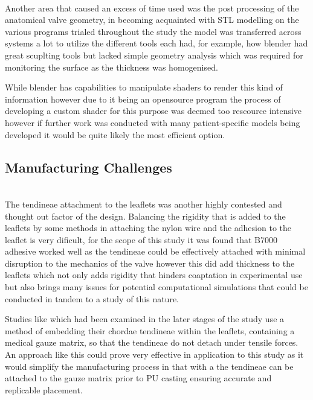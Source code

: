 \\
Another area that caused an excess of time used was the post processing of the anatomical valve geometry, in becoming acquainted with STL modelling on the various programs trialed throughout the study the model was transferred across systems a lot to utilize the different tools each had, for example, how blender had great scuplting tools but lacked simple geometry analysis which was required for monitoring the surface as the thickness was homogenised.

While blender has capabilities to manipulate shaders to render this kind of information however due to it being an opensource program the process of developing a custom shader for this purpose was deemed too rescource intensive however if further work was conducted with many patient-specific models being developed it would be quite likely the most efficient option.

\subsection{Manufacturing Challenges}

\\
The tendineae attachment to the leaflets was another highly contested and thought out factor of the design. Balancing the rigidity that is added to the leaflets by some methods in attaching the nylon wire and the adhesion to the leaflet is very dificult, for the scope of this study it was found that B7000 adhesive worked well as the tendineae could be effectively attached with minimal disruption to the mechanics of the valve however this did add thickness to the leaflets which not only adds rigidity that hinders coaptation in experimental use but also brings many issues for potential computational simulations that could be conducted in tandem to a study of this nature.

Studies like  which had been examined in the later stages of the study use a method of embedding their chordae tendineae within the leaflets, containing a medical gauze matrix, so that the tendineae do not detach under tensile forces. An approach like this could prove very effective in application to this study as it would simplify the manufacturing process in that with a the tendineae can be attached to the gauze matrix prior to \gls{PU} casting ensuring accurate and replicable placement.

